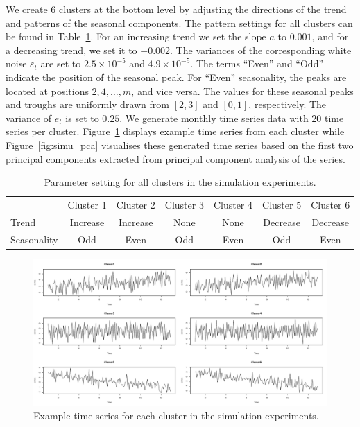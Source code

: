 \documentclass[a4paper,review,12pt,authoryear]{elsarticle}
\begin{document}
We create $6$ clusters at the bottom level by adjusting the directions of the trend and patterns of the seasonal components.
The pattern settings for all clusters can be found in Table~\ref{table:simu_params}. For an increasing trend we set the slope $a$ to $0.001$, and for a decreasing trend, we set it to $-0.002$. The variances of the corresponding white noise $\varepsilon_t$ are set to $2.5\times 10^{-5}$ and $4.9\times 10^{-5}$. The terms ``Even'' and ``Odd'' indicate the position of the seasonal peak. For ``Even'' seasonality, the peaks are located at positions $2, 4, \dots, m$, and vice versa. The values for these seasonal peaks and troughs are uniformly drawn from $[2, 3]$ and $[0,1]$, respectively. The variance of $e_t$ is set to $0.25$. We generate monthly time series data with $20$ time series per cluster. Figure~\ref{fig:simu_emps} displays example time series from each cluster while Figure~\ref{fig:simu_pca} visualises these generated time series based on the first two principal components extracted from principal component analysis of the series.

\begin{table}
\caption{\label{table:simu_params}Parameter setting for all clusters in the simulation experiments.}
\centering
\begin{tabular}{lcccccc}\toprule
& Cluster 1 & Cluster 2 & Cluster 3 & Cluster 4 & Cluster 5 & Cluster 6 \\
Trend & Increase & Increase & None & None & Decrease & Decrease \\
Seasonality & Odd & Even & Odd & Even & Odd & Even  \\
    \bottomrule
\end{tabular}
\end{table}

\begin{figure}
\centering
\includegraphics[width=\textwidth]{figures/simu_example.pdf}
\caption{\label{fig:simu_emps}Example time series for each cluster in the simulation experiments.}
\end{figure}
\end{document}

